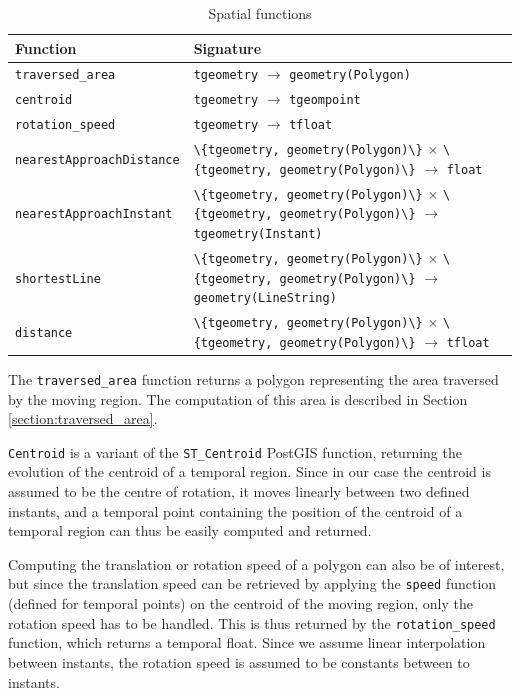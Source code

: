 \begin{table}[h!]
    \centering
    \begin{tabularx}{\textwidth}{|l|X|}
    \hline
    \textbf{Function}   & \textbf{Signature} \\ 
    \hline
    \lstinline+traversed_area+      & \lstinline+tgeometry+ $\rightarrow$ \lstinline+geometry(Polygon)+\\
    \hline
    \lstinline+centroid+            & \lstinline+tgeometry+ $\rightarrow$ \lstinline+tgeompoint+\\
    \hline
    \lstinline+rotation_speed+      & \lstinline+tgeometry+ $\rightarrow$ \lstinline+tfloat+ \\
    \hline
    \lstinline+nearestApproachDistance+ & \lstinline+\{tgeometry, geometry(Polygon)\}+ $\times$ \lstinline+\{tgeometry, geometry(Polygon)\}+ $\rightarrow$ \lstinline+float+ \\
    \hline
    \lstinline+nearestApproachInstant+  & \lstinline+\{tgeometry, geometry(Polygon)\}+ $\times$ \lstinline+\{tgeometry, geometry(Polygon)\}+ $\rightarrow$ \lstinline+tgeometry(Instant)+ \\
    \hline
    \lstinline+shortestLine+         & \lstinline+\{tgeometry, geometry(Polygon)\}+ $\times$ \lstinline+\{tgeometry, geometry(Polygon)\}+ $\rightarrow$ \lstinline+geometry(LineString)+ \\
    \hline
    \lstinline+distance+         & \lstinline+\{tgeometry, geometry(Polygon)\}+ $\times$ \lstinline+\{tgeometry, geometry(Polygon)\}+ $\rightarrow$ \lstinline+tfloat+ \\
    \hline
    \end{tabularx}
    \caption{Spatial functions}
    \label{table:spatial_funcs}
\end{table}

The \lstinline{traversed_area} function returns a polygon representing the area traversed by the moving region. The computation of this area is described in Section \ref{section:traversed_area}.

\lstinline{Centroid} is a variant of the \lstinline{ST_Centroid} PostGIS function, returning the evolution of the centroid of a temporal region. Since in our case the centroid is assumed to be the centre of rotation, it moves linearly between two defined instants, and a temporal point containing the position of the centroid of a temporal region can thus be easily computed and returned.

Computing the translation or rotation speed of a polygon can also be of interest, but since the translation speed can be retrieved by applying the \lstinline{speed} function (defined for temporal points) on the centroid of the moving region, only the rotation speed has to be handled. This is thus returned by the \lstinline{rotation_speed} function, which returns a temporal float. Since we assume linear interpolation between instants, the rotation speed is assumed to be constants between to instants.


